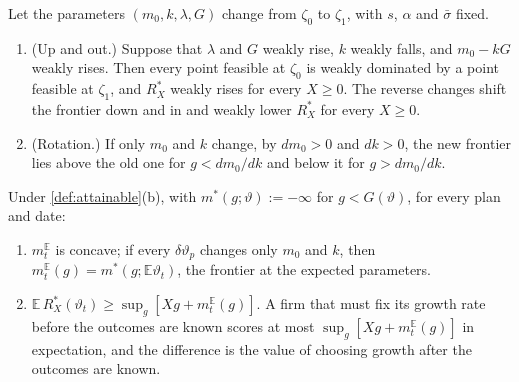 \begin{remark}\label{prop:ai-shift}
Let the parameters $(m_0,k,\lambda,G)$ change from $\zeta_0$ to $\zeta_1$, with $s$, $\alpha$ and $\bar\sigma$ fixed.
\begin{enumerate}
\item[(a)] (Up and out.) Suppose that $\lambda$ and $G$ weakly rise, $k$ weakly falls, and $m_0-kG$ weakly rises. Then every point feasible at $\zeta_0$ is weakly dominated by a point feasible at $\zeta_1$, and $R_X^*$ weakly rises for every $X\ge 0$. The reverse changes shift the frontier down and in and weakly lower $R_X^*$ for every $X\ge 0$.
\item[(b)] (Rotation.) If only $m_0$ and $k$ change, by $dm_0>0$ and $dk>0$, the new frontier lies above the old one for $g<dm_0/dk$ and below it for $g>dm_0/dk$.
\end{enumerate}
\end{remark}

\begin{lemma}\label{lem:expected-frontier}
Under \autoref{def:attainable}(b), with $m^*(g;\vartheta):=-\infty$ for $g<G(\vartheta)$, for every plan and date:
\begin{enumerate}
\item[(a)] $m^{\mathbb E}_t$ is concave; if every $\delta\vartheta_p$ changes only $m_0$ and $k$, then $m^{\mathbb E}_t(g)=m^*(g;\mathbb E\vartheta_t)$, the frontier at the expected parameters.
\item[(b)] $\mathbb E\,R^*_X(\vartheta_t)\ge\sup_g[Xg+m^{\mathbb E}_t(g)]$. A firm that must fix its growth rate before the outcomes are known scores at most $\sup_g[Xg+m^{\mathbb E}_t(g)]$ in expectation, and the difference is the value of choosing growth after the outcomes are known.
\end{enumerate}
\end{lemma}
